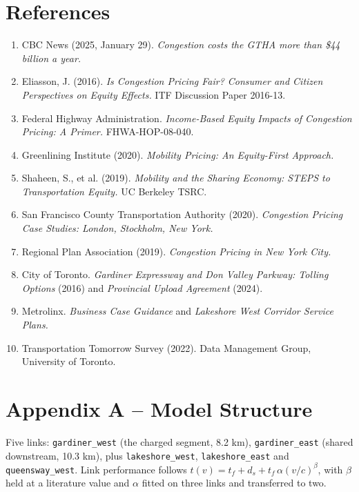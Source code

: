 \documentclass[11pt,letterpaper]{article}
\begin{document}
\newpage
\begin{singlespace}
\section*{References}
\small
\begin{enumerate}[leftmargin=*,itemsep=1pt]
\item CBC News (2025, January 29). \textit{Congestion costs the GTHA more than
\$44 billion a year.}
\item Eliasson, J. (2016). \textit{Is Congestion Pricing Fair? Consumer and
Citizen Perspectives on Equity Effects.} ITF Discussion Paper 2016-13.
\item Federal Highway Administration. \textit{Income-Based Equity Impacts of
Congestion Pricing: A Primer.} FHWA-HOP-08-040.
\item Greenlining Institute (2020). \textit{Mobility Pricing: An Equity-First
Approach.}
\item Shaheen, S., et al. (2019). \textit{Mobility and the Sharing Economy:
STEPS to Transportation Equity.} UC Berkeley TSRC.
\item San Francisco County Transportation Authority (2020). \textit{Congestion
Pricing Case Studies: London, Stockholm, New York.}
\item Regional Plan Association (2019). \textit{Congestion Pricing in New York
City.}
\item City of Toronto. \textit{Gardiner Expressway and Don Valley Parkway:
Tolling Options} (2016) and \textit{Provincial Upload Agreement} (2024).
\item Metrolinx. \textit{Business Case Guidance} and \textit{Lakeshore West
Corridor Service Plans.}
\item Transportation Tomorrow Survey (2022). Data Management Group, University
of Toronto.
\end{enumerate}

\section*{Appendix A -- Model Structure}
\small
Five links: \texttt{gardiner\_west} (the charged segment, 8.2 km),
\texttt{gardiner\_east} (shared downstream, 10.3 km), plus
\texttt{lakeshore\_west}, \texttt{lakeshore\_east} and
\texttt{queensway\_west}. Link performance follows
$t(v)=t_{f}+d_{s}+t_{f}\,\alpha (v/c)^{\beta}$, with $\beta$ held at a
literature value and $\alpha$ fitted on three links and transferred to two.


\end{singlespace}
\end{document}
